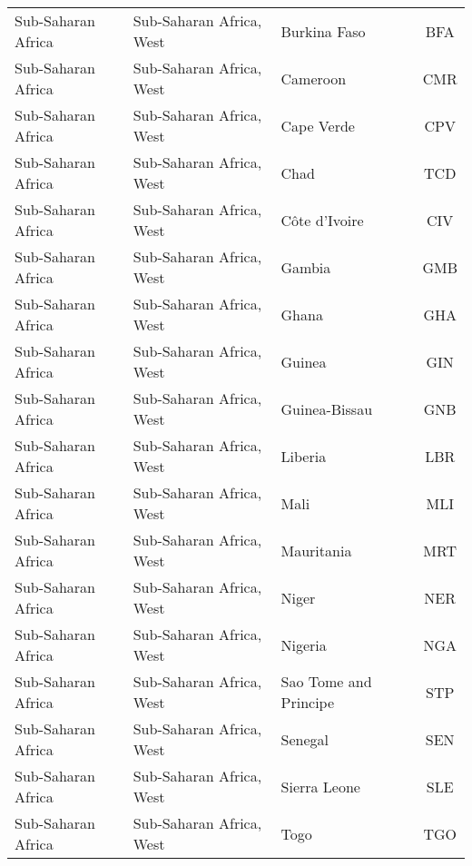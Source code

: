 \begin{longtable}{|p{3cm}|p{3.5cm}|p{5cm}|c|}
            Sub-Saharan Africa &     Sub-Saharan Africa, West &                                      Burkina Faso &  BFA \\
            Sub-Saharan Africa &     Sub-Saharan Africa, West &                                          Cameroon &  CMR \\
            Sub-Saharan Africa &     Sub-Saharan Africa, West &                                        Cape Verde &  CPV \\
            Sub-Saharan Africa &     Sub-Saharan Africa, West &                                              Chad &  TCD \\
            Sub-Saharan Africa &     Sub-Saharan Africa, West &                                     C\^ote d'Ivoire &  CIV \\
            Sub-Saharan Africa &     Sub-Saharan Africa, West &                                            Gambia &  GMB \\
            Sub-Saharan Africa &     Sub-Saharan Africa, West &                                             Ghana &  GHA \\
            Sub-Saharan Africa &     Sub-Saharan Africa, West &                                            Guinea &  GIN \\
            Sub-Saharan Africa &     Sub-Saharan Africa, West &                                     Guinea-Bissau &  GNB \\
            Sub-Saharan Africa &     Sub-Saharan Africa, West &                                           Liberia &  LBR \\
            Sub-Saharan Africa &     Sub-Saharan Africa, West &                                              Mali &  MLI \\
            Sub-Saharan Africa &     Sub-Saharan Africa, West &                                        Mauritania &  MRT \\
            Sub-Saharan Africa &     Sub-Saharan Africa, West &                                             Niger &  NER \\
            Sub-Saharan Africa &     Sub-Saharan Africa, West &                                           Nigeria &  NGA \\
            Sub-Saharan Africa &     Sub-Saharan Africa, West &                             Sao Tome and Principe &  STP \\
            Sub-Saharan Africa &     Sub-Saharan Africa, West &                                           Senegal &  SEN \\
            Sub-Saharan Africa &     Sub-Saharan Africa, West &                                      Sierra Leone &  SLE \\
            Sub-Saharan Africa &     Sub-Saharan Africa, West &                                              Togo &  TGO \\
\hline
\end{longtable}